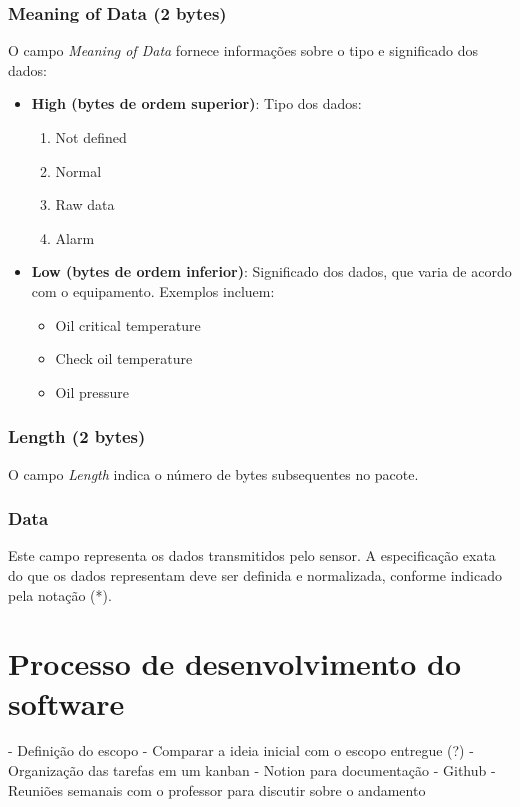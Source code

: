 \subsubsection{Meaning of Data (2 bytes)}

O campo \textit{Meaning of Data} fornece informações sobre o tipo e significado dos dados:

\begin{itemize}
    \item \textbf{High (bytes de ordem superior)}: Tipo dos dados:
    \begin{enumerate}
        \item Not defined
        \item Normal
        \item Raw data
        \item Alarm
    \end{enumerate}
    \item \textbf{Low (bytes de ordem inferior)}: Significado dos dados, que varia de acordo com o equipamento. Exemplos incluem:
    \begin{itemize}
        \item Oil critical temperature
        \item Check oil temperature
        \item Oil pressure
    \end{itemize}
\end{itemize}

\subsubsection{Length (2 bytes)}

O campo \textit{Length} indica o número de bytes subsequentes no pacote.

\subsubsection{Data}

Este campo representa os dados transmitidos pelo sensor. A especificação exata do que os dados representam deve ser definida e normalizada, conforme indicado pela notação (*).


\section[Processo de desenvolvimento do software]{Processo de desenvolvimento do software}

- Definição do escopo - Comparar a ideia inicial com o escopo entregue (?)
- Organização das tarefas em um kanban
- Notion para documentação
- Github
- Reuniões semanais com o professor para discutir sobre o andamento


